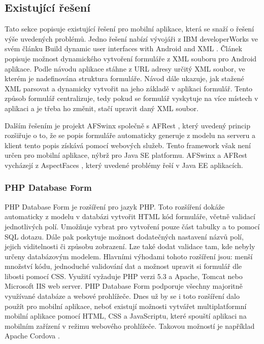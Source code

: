 \subsection{Existující řešení}
Tato sekce popisuje existující řešení pro mobilní aplikace, která se snaží o řešení výše uvedených problémů. Jedno řešení nabízí vývojáři z IBM developerWorks ve svém článku Build dynamic user interfaces with Android and XML \cite{dynamic-android-xml}. Článek popisuje možnost dynamického vytvoření formuláře z XML souboru pro Android aplikace. Podle návodu aplikace stáhne z URL adresy určitý XML soubor, ve kterém je nadefinována struktura formuláře. Návod dále ukazuje, jak stažené XML parsovat a dynamicky vytvořit na jeho základě v aplikaci formulář. Tento způsob formulář centralizuje, tedy pokud se formulář vyskytuje na více místech v aplikaci a je třeba ho změnit, stačí upravit daný XML soubor.

Dalším řešením je projekt AFSwinx společně s AFRest \cite{tomasek-thesis}, který uvedený princip rozšiřuje o to, že se popis formuláře automaticky generuje z modelu na serveru a klient tento popis získává pomocí webových služeb. Tento framework však není určen pro mobilní aplikace, nýbrž pro Java SE platformu. AFSwinx a AFRest vycházejí z AspectFaces \cite{aspect-faces}, který  uvedené problémy řeší v Java EE aplikacích.

\subsubsection{PHP Database Form}
PHP Database Form \cite{phpdbform} je rozšíření pro jazyk PHP. Toto rozšíření dokáže automaticky z modelu v databázi vytvořit HTML kód formuláře, včetně validací jednotlivých polí. Umožňuje vybrat pro vytvoření pouze část tabulky a to pomocí SQL dotazu. Dále pak poskytuje možnost dodatečných nastavení názvů polí, jejich viditelnosti či způsobu zobrazení. Lze také dodat validace tam, kde nebyly určeny databázovým modelem. Hlavními výhodami tohoto rozšíření jsou: menší množství kódu, jednoduché validování dat a možnost upravit si formulář dle libosti pomocí CSS. Využití vyžaduje PHP verzi 5.3 a Apache, Tomcat nebo Microsoft IIS web server. PHP Database Form podporuje všechny majoritně využívané databáze a webové prohlížeče. Dnes už by se i toto rozšíření dalo použít pro mobilní aplikace, neboť existují možnosti vytvářet multiplatformní mobilní aplikace pomocí HTML, CSS a JavaScriptu, které spouští aplikaci na mobilním zařízení v režimu webového prohlížeče. Takovou možností je například Apache Cordova \cite{apache-cordova}.

